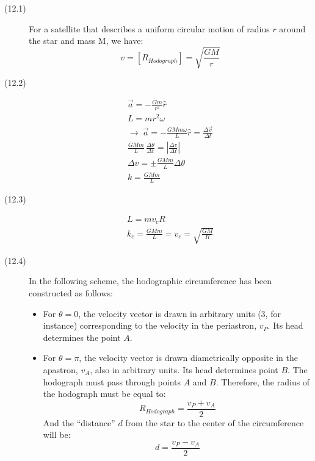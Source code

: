 \begin{description}
\item[(12.1)] For a satellite that describes a uniform circular motion of
radius $r$ around the star and mass M, we have:
\begin{equation*}
v = \left[R_{Hodograph}\right] = \sqrt{\frac{GM}{r}} \tag*{[1 point]}
\end{equation*}

\item[(12.2)]
\begin{gather*}
\vec{a} = -\frac{Gm}{r^2}\hat{r} \tag*{[1 point]} \\
L = mr^2\omega \tag*{[1 point]} \\
\rightarrow\ \vec{a} = -\frac{GMm\omega}{L}\hat{r}
  = \frac{\Delta\vec{v}}{\Delta t} \\
\frac{GMm}{L}\,\frac{\Delta\theta}{\Delta t}
  = \left|\frac{\Delta v}{\Delta t}\right| \\
\Delta v = \pm\frac{GMm}{L}\Delta\theta \\
k = \frac{GMm}{L} \tag*{[2 points]}
\end{gather*}

\item[(12.3)]
\begin{gather*}
L = mv_c R \tag*{[1 point]} \\
k_c = \frac{GMm}{L} = v_c = \sqrt{\frac{GM}{R}} \tag*{[1 point]}
\end{gather*}

\item[(12.4)] In the following scheme, the hodographic circumference has
been constructed as follows:
\begin{itemize}
\item For $\theta = 0$, the velocity vector is drawn in arbitrary units (3,
  for instance) corresponding to the velocity in the periastron, $v_P$. Its
  head determines the point $A$.
\item For $\theta = \pi$, the velocity vector is drawn diametrically
  opposite in the apastron, $v_A$, also in arbitrary units. Its head
  determines point $B$. The hodograph must pass through points $A$ and $B$.
  Therefore, the radius of the hodograph must be equal to:
\begin{equation*}
R_{Hodograph} = \frac{v_P + v_A}{2} \tag*{[1 point]}
\end{equation*}
  And the ``distance'' $d$ from the star to the center of the circumference
  will be:
\begin{equation*}
d = \frac{v_P - v_A}{2} \tag*{[1 point]}
\end{equation*}
\end{itemize}


\end{description}
